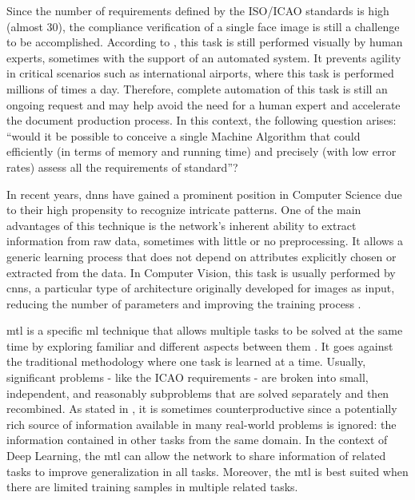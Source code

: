 Since the number of requirements defined by the ISO/ICAO standards is high (almost 30), the compliance verification of a single face image is still a challenge to be accomplished. According to \cite{ferrara2012multi}, this task is still performed visually by human experts, sometimes with the support of an automated system. It prevents agility in critical scenarios such as international airports, where this task is performed millions of times a day. Therefore, complete automation of this task is still an ongoing request and may help avoid the need for a human expert and accelerate the document production process. In this context, the following question arises: ``would it be possible to conceive a single Machine Algorithm that could efficiently (in terms of memory and running time) and precisely (with low error rates) assess all the requirements of \icao standard''?

In recent years, \acfp{dnn} have gained a prominent position in Computer Science due to their high propensity to recognize intricate patterns. One of the main advantages of this technique is the network's inherent ability to extract information from raw data, sometimes with little or no preprocessing. It allows a generic learning process that does not depend on attributes explicitly chosen or extracted from the data. In Computer Vision, this task is usually performed by \acfp{cnn}, a particular type of architecture originally developed for images as input, reducing the number of parameters and improving the training process \citep{goodfellow2016deep}.

\acf{mtl} is a specific \acl{ml} technique that allows multiple tasks to be solved at the same time by exploring familiar and different aspects between them \citep{zhang2017survey}. It goes against the traditional methodology where one task is learned at a time. Usually, significant problems - like the ICAO requirements - are broken into small, independent, and reasonably subproblems that are solved separately and then recombined. As stated in \cite{Caruana1997}, it is sometimes counterproductive since a potentially rich source of information available in many real-world problems is ignored: the information contained in other tasks from the same domain. In the context of Deep Learning, the \acs{mtl} can allow the network to share information of related tasks to improve generalization in all tasks. Moreover, the \acl{mtl} is best suited when there are limited training samples in multiple related tasks.

